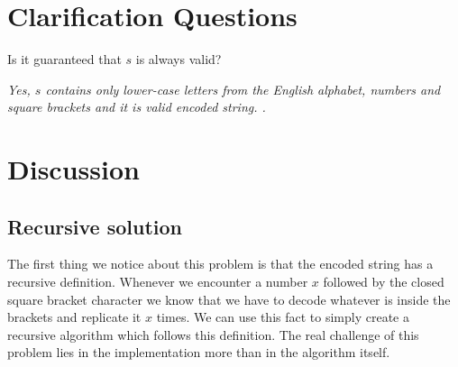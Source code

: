 \section{Clarification Questions}

\begin{QandA}
	\item \begin{questionitem} \begin{question} Is it guaranteed that $s$ is always valid?  \end{question} 	 
    \begin{answered}
		\textit{Yes, $s$ contains only lower-case letters from the English alphabet, numbers and square brackets and it is valid encoded string. .}
	\end{answered} \end{questionitem}

\end{QandA}

\section{Discussion}
\label{decode_string:sec:discussion}


\subsection{Recursive solution}
\label{decode_string:sec:recursive}
The first thing we notice about this problem is that the encoded string has a recursive definition.
Whenever we encounter a number $x$ followed by the closed square bracket character  \inline{'['} 
we know that we have
to decode whatever is inside the brackets and replicate it $x$ times.
We can use this fact to simply create a recursive algorithm which follows this definition.
The real challenge of this
problem lies in the implementation more than in the algorithm itself.

